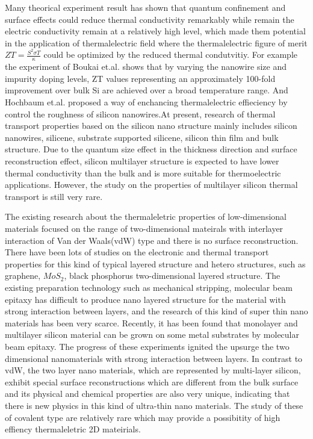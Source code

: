 \documentclass[%
 reprint,
 amsmath,amssymb,
 aps,
 prb,
]{revtex4-1}
\begin{document}
Many theorical experiment result has shown that quantum confinement and surface effects could reduce thermal conductivity remarkably while remain the electric conductivity remain at a relatively high level, which made them potential in the application of thermalelectric field where the thermalelectric figure of merit $ZT=\frac{S^2 \sigma T}{\kappa}$ could be optimized by the reduced thermal condutvitiy. For example
the experiment of Boukai et.al.\cite{Boukai2008} shows that by varying the nanowire size and impurity doping levels, ZT values representing an approximately 100-fold improvement over bulk Si are achieved over a broad temperature range. And Hochbaum et.al.\cite{Hochbaum2008} proposed a way of enchancing thermalelectric effieciency by control the roughness of silicon nanowires.At present, research of thermal transport properties based on the silicon nano structure mainly includes silicon nanowires\cite{Hochbaum2008,Yang2010,Shi2009,Boukai2008}, silicene\cite{Pei2013,Ng2013,Xie2014,Zhang2014,Liu2014}, substrate supported silicene\cite{Wang2015,Zhang2015a}, silicon thin film and bulk structure\cite{Bodapati2006,Tang2013Thermal,Jeong2012Thermal,Liu2006Thermal,Wang2006Lattice}. Due to the quantum size effect in the thickness direction and surface reconstruction effect, silicon multilayer structure is expected to have lower thermal conductivity than the bulk and is more suitable for thermoelectric applications. However, the study on the properties of multilayer silicon thermal transport is still very rare.

The existing research about the thermaleletric properties of low-dimensional materials focused on the range of  two-dimensional mateirals with interlayer interaction of  Van der Waals(vdW) type and there is no surface reconstruction. There have been lots of studies on the electronic and thermal transport properties for this kind of typical layered structure and hetero structures, such as graphene\cite{Lindsay2011,Ni2012,Wang2011}, $MoS_2$\cite{Liu2015}, black phosphorus\cite{Zhang2015,Peng2015,Jain2015} two-dimensional layered structure. The existing preparation technology such as mechanical stripping, molecular beam epitaxy has difficult to produce nano layered structure for the material with strong interaction between layers, and the research of this kind of super thin nano materials has been very scarce. Recently, it has been found that monolayer and multilayer silicon material can be grown on some metal substrates by molecular beam epitaxy\cite{Fleurence2012,Meng2013,Vogt2012,DePadova2013,Feng2012}. The progress of these experiments ignited the upsurge the two dimensional nanomaterials with strong interaction between layers. In contrast to vdW, the two layer nano materials, which are represented by multi-layer silicon, exhibit special surface reconstructions which are different from the bulk surface\cite{Fleurence2012,Meng2013,Feng2012,Guo2013} and its physical and chemical properties are also very unique\cite{Guo2013,Guo2015}, indicating that there is new physics in this kind of ultra-thin nano materials. The study of these of covalent type are relatively rare which may provide a possibitity of high effiency thermaleletric 2D mateirials.
\end{document}
